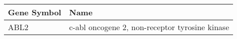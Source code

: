 \begin{tabular}{ll}
\toprule
Gene Symbol &                                           Name \\
\midrule
       ABL2 & c-abl oncogene 2, non-receptor tyrosine kinase \\
\bottomrule
\end{tabular}
